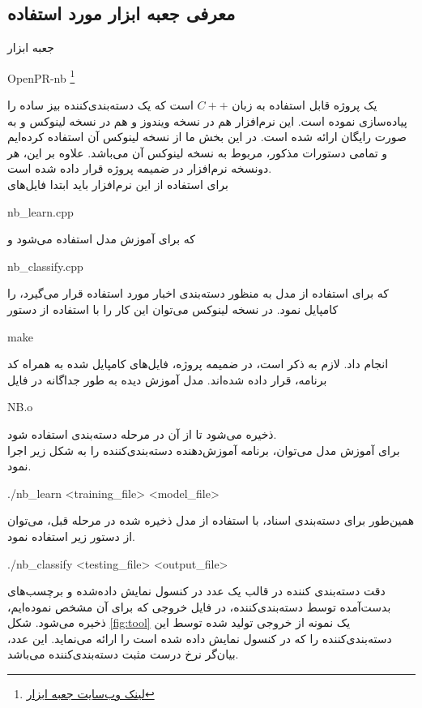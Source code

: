 \documentclass[11.5pt,a4paper]{article}
\begin{document}
\subsection{معرفی جعبه ابزار مورد استفاده}
جعبه ابزار 
\begin{latin}
OpenPR-nb \footnote{\href{http://www.openpr.org.cn/index.php/NLP-Toolkit-for-Natural-Language-Processing/43-Naive-Bayes-Classfier/View-details.html}{لینک وب‌سایت جعبه ابزار}}
\end{latin}
یک پروژه قابل استفاده به زبان $C++$ است که یک دسته‌بندی‌کننده بیز ساده را پیاده‌سازی نموده است. این نرم‌افزار هم در نسخه ویندوز و هم در نسخه لینوکس و به صورت رایگان ارائه شده است. در این بخش ما از نسخه لینوکس آن استفاده کرده‌ایم و تمامی دستورات مذکور، مربوط به نسخه لینوکس آن می‌باشد. علاوه بر این، هر دونسخه نرم‌افزار در ضمیمه پروژه قرار داده شده است.
\\
برای استفاده از این نرم‌افزار باید ابتدا فایل‌های 
\begin{latin}
nb\_learn.cpp
\end{latin} 
که برای آموزش مدل استفاده می‌شود و
\begin{latin}
nb\_classify.cpp
\end{latin}
که برای استفاده از مدل به منظور دسته‌بندی اخبار مورد استفاده قرار می‌گیرد، را کامپایل نمود. در نسخه لینوکس می‌توان این کار را با استفاده از دستور 
\begin{latin}
make
\end{latin}
انجام داد. لازم به ذکر است، در ضمیمه پروژه،‌ فایل‌های کامپایل شده به همراه کد برنامه، قرار داده شده‌اند. مدل آموزش دیده به طور جداگانه در فایل 
\begin{latin}
NB.o
\end{latin}
ذخیره‌ می‌شود تا از آن در مرحله دسته‌بندی استفاده شود.
\\
برای آموزش مدل می‌توان، برنامه آموزش‌دهنده دسته‌بندی‌کننده را به شکل زیر اجرا نمود.
\begin{latin}
\center
./nb\_learn <training\_file> <model\_file>
\end{latin}
همین‌طور برای دسته‌بندی اسناد، با استفاده از مدل ذخیره شده در مرحله قبل، می‌توان از دستور زیر استفاده نمود.
\begin{latin}
\center
./nb\_classify <testing\_file> <output\_file>
\end{latin}

دقت دسته‌بندی کننده در قالب یک عدد در کنسول نمایش داده‌شده و برچسب‌های بدست‌آمده توسط دسته‌بندی‌کننده، در فایل خروجی که برای آن مشخص نموده‌ایم، ذخیره می‌شود. شکل
\ref{fig:tool}
یک نمونه از خروجی تولید شده توسط این دسته‌بندی‌کننده را که در کنسول نمایش داده شده است را ارائه می‌نماید. این عدد، بیان‌گر نرخ درست مثبت دسته‌بندی‌کننده می‌باشد.
\end{document}
